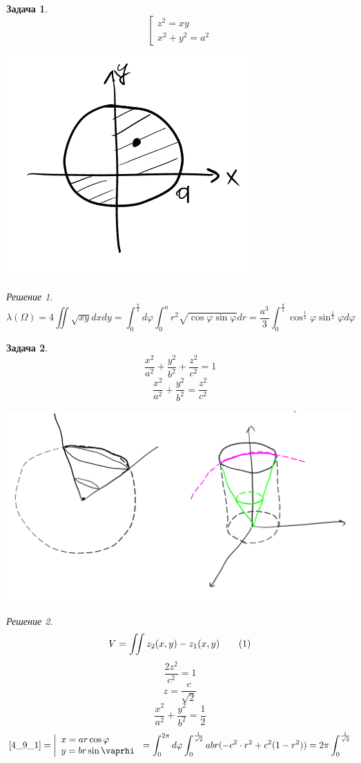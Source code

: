 \documentclass[english]{article}
\newcommand\addtag{\refstepcounter{equation}\tag{\theequation}}
\theoremstyle{plain}
\theoremstyle{remark}
\newtheorem*{solution}{Решение}
\theoremstyle{definition}
\newtheorem{task}{Задача}
\begin{document}
\begin{task}
\[ \left[\begin{array}{l} z^2 = xy \\ x^2 + y^2 = a^2 \end{array}\right. \]
\begin{center}
\includegraphics[scale=0.5]{4_4.png}
\end{center}
\end{task}
\begin{solution}
\[ \lambda(\Omega) = 4 \iint \sqrt{xy} dx dy = \int^{\frac{\pi}{2}}_0 d\varphi \int^a_0 r^2 \sqrt{\cos\varphi\sin\varphi} dr = \frac{a^3}{3} \int^{\frac{\pi}{2}}_0 \cos^{\frac{1}{2}}\varphi \sin^{\frac{1}{2}}\varphi d\varphi\]
\end{solution}
\begin{task}
\[ \frac{x^2}{a^2} + \frac{y^2}{b^2} + \frac{z^2}{c^2} = 1 \]
\[ \frac{x^2}{a^2} + \frac{y^2}{b^2} = \frac{z^2}{c^2} \]
\begin{center}
\includegraphics[scale=0.4]{4_6.png}
\end{center}
\end{task}
\begin{solution}
\[ V = \iint z_2 (x, y) - z_1(x, y) \addtag\label{4_9_1}\]
\[\frac{2z^2}{c^2} = 1\]
\[ z = \frac{c}{\sqrt{2}} \]
\[ \frac{x^2}{a^2} + \frac{y^2}{b^2} = \frac{1}{2} \]
\[ \ref{4_9_1} = \left|\begin{array}{l}x = ar\cos \varphi \\ y = br\sin\vaprhi\end{array}\right. = \int^{2\pi}_0 d\varphi \int^{\frac{1}{\sqrt{2}}}_0 abr(-c^2\cdot r^2 + c^2(1 - r^2)) = 2\pi \int^{\frac{1}{\sqrt{2}}}_0\]
\end{solution}
\end{document}
